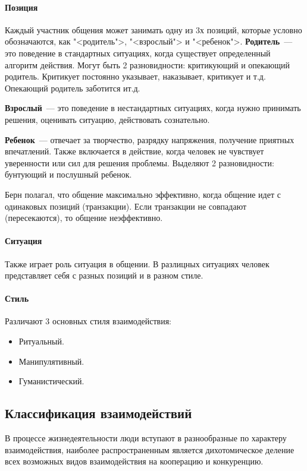 \paragraph{Позиция}
Каждый участник общения может занимать одну из 3х позиций, которые условно обозначаются, как "<родитель">, "<взрослый"> и "<ребенок">. \textbf{Родитель}~--- это поведение в стандартных ситуациях, когда существует определенный алгоритм действия. Могут быть 2 разновидности: критикующий и опекающий родитель. Критикует постоянно указывает, наказывает, критикует и т.д. Опекающий родитель заботится ит.д.

\textbf{Взрослый}~--- это поведение в нестандартных ситуациях, когда нужно принимать решения, оценивать ситуацию, действовать сознательно.

\textbf{Ребенок}~--- отвечает за творчество, разрядку напряжения, получение приятных впечатлений. Также включается в действие, когда человек не чувствует уверенности или сил для решения проблемы. Выделяют 2 разновидности: бунтующий и послушный ребенок.

Берн полагал, что общение максимально эффективно, когда общение идет с одинаковых позиций (транзакции). Если транзакции не совпадают (пересекаются), то общение неэффективно.

\paragraph{Ситуация}
Также играет роль ситуация в общении. В разлицных ситуациях человек представляет себя с разных позиций и в разном стиле.
\paragraph{Стиль}
Различают 3 основных стиля взаимодействия:
\begin{itemize}
	\item Ритуальный.
	\item Манипулятивный.
	\item Гуманистический.
\end{itemize}

\subsection{Классификация взаимодействий}
В процессе жизнедеятельности люди вступают в разнообразные по характеру взаимодействия, наиболее распространенным является дихотомическое деление всех возможных видов взаимодействия на кооперацию и конкуренцию.


